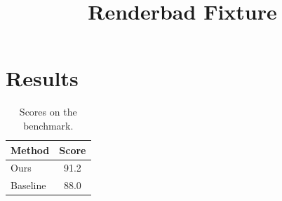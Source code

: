 \documentclass{article}
\title{Renderbad Fixture}
\newcommand{\ours}{Ours}
\begin{document}
\section{Results}
\begin{table}
\centering
\caption{Scores on the benchmark.}
\label{tab:scores}
\begin{tabular}{lc}
\toprule
Method & Score \\
\midrule
\ours & 91.2 \\
Baseline & 88.0 \\
\bottomrule
\end{tabular}
\end{table}
\end{document}
